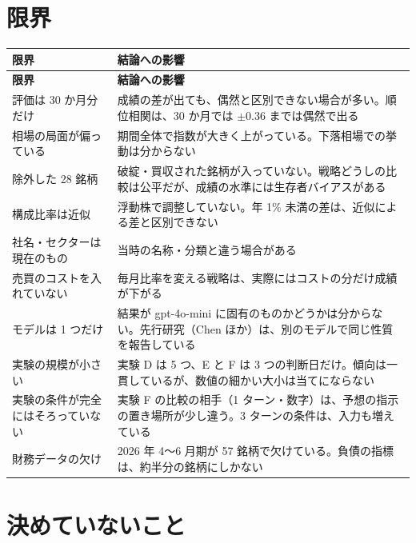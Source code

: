 \documentclass[xelatex,ja=standard,jafont=hiragino-pron,a4paper,10pt]{bxjsreport}
\begin{document}
\section{限界}\label{sec:limits}

\begin{longtable}{p{4.20cm}p{10.20cm}}
\toprule
\textbf{限界} & \textbf{結論への影響} \\
\midrule
\endfirsthead
\toprule
\textbf{限界} & \textbf{結論への影響} \\
\midrule
\endhead
\bottomrule
\endfoot
評価は 30 か月分だけ & 成績の差が出ても、偶然と区別できない場合が多い。順位相関は、30 か月では $\pm 0.36$ までは偶然で出る \\
相場の局面が偏っている & 期間全体で指数が大きく上がっている。下落相場での挙動は分からない \\
除外した 28 銘柄 & 破綻・買収された銘柄が入っていない。戦略どうしの比較は公平だが、成績の水準には生存者バイアスがある \\
構成比率は近似 & 浮動株で調整していない。年 1\% 未満の差は、近似による差と区別できない \\
社名・セクターは現在のもの & 当時の名称・分類と違う場合がある \\
売買のコストを入れていない & 毎月比率を変える戦略は、実際にはコストの分だけ成績が下がる \\
モデルは 1 つだけ & 結果が gpt-4o-mini に固有のものかどうかは分からない。先行研究（Chen ほか）は、別のモデルで同じ性質を報告している \\
実験の規模が小さい & 実験 D は 5 つ、E と F は 3 つの判断日だけ。傾向は一貫しているが、数値の細かい大小は当てにならない \\
実験の条件が完全にはそろっていない & 実験 F の比較の相手（1 ターン・数字）は、予想の指示の置き場所が少し違う。3 ターンの条件は、入力も増えている \\
財務データの欠け & 2026 年 4〜6 月期が 57 銘柄で欠けている。負債の指標は、約半分の銘柄にしかない \\
\end{longtable}

\section{決めていないこと}
\end{document}

